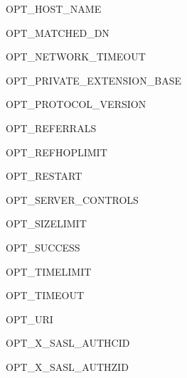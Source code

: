 \begin{datadesc}{OPT_HOST_NAME}
\end{datadesc}

\begin{datadesc}{OPT_MATCHED_DN}
\end{datadesc}

\begin{datadesc}{OPT_NETWORK_TIMEOUT}
\end{datadesc}

\begin{datadesc}{OPT_PRIVATE_EXTENSION_BASE}
\end{datadesc}

\begin{datadesc}{OPT_PROTOCOL_VERSION}
\end{datadesc}

\begin{datadesc}{OPT_REFERRALS}
\end{datadesc}

\begin{datadesc}{OPT_REFHOPLIMIT}
\end{datadesc}

\begin{datadesc}{OPT_RESTART}
\end{datadesc}

\begin{datadesc}{OPT_SERVER_CONTROLS}
\end{datadesc}

\begin{datadesc}{OPT_SIZELIMIT}
\end{datadesc}

\begin{datadesc}{OPT_SUCCESS}
\end{datadesc}

\begin{datadesc}{OPT_TIMELIMIT}
\end{datadesc}

\begin{datadesc}{OPT_TIMEOUT}
\end{datadesc}

\begin{datadesc}{OPT_URI}
\end{datadesc}

\begin{datadesc}{OPT_X_SASL_AUTHCID}
\end{datadesc}

\begin{datadesc}{OPT_X_SASL_AUTHZID}
\end{datadesc}

